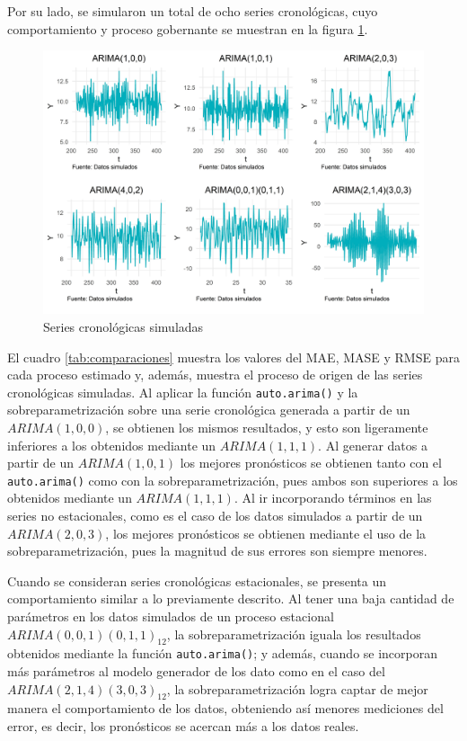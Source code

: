 \documentclass[
]{article}
\begin{document}
Por su lado, se simularon un total de ocho series cronológicas, cuyo
comportamiento y proceso gobernante se muestran en la figura
\ref{fig:series_simuladas}.

\begin{figure}[!h]
\includegraphics[width=1\linewidth,height=1\textheight]{Tesis_files/figure-latex/series_simuladas-1} \caption{Series cronológicas simuladas}\label{fig:series_simuladas}
\end{figure}

El cuadro \ref{tab:comparaciones} muestra los valores del MAE, MASE y
RMSE para cada proceso estimado y, además, muestra el proceso de origen
de las series cronológicas simuladas. Al aplicar la función
\texttt{auto.arima()} y la sobreparametrización sobre una serie
cronológica generada a partir de un \(ARIMA(1,0,0)\), se obtienen los
mismos resultados, y esto son ligeramente inferiores a los obtenidos
mediante un \(ARIMA(1,1,1)\). Al generar datos a partir de un
\(ARIMA(1,0,1)\) los mejores pronósticos se obtienen tanto con el
\texttt{auto.arima()} como con la sobreparametrización, pues ambos son
superiores a los obtenidos mediante un \(ARIMA(1,1,1)\). Al ir
incorporando términos en las series no estacionales, como es el caso de
los datos simulados a partir de un \(ARIMA(2,0,3)\), los mejores
pronósticos se obtienen mediante el uso de la sobreparametrización, pues
la magnitud de sus errores son siempre menores.

Cuando se consideran series cronológicas estacionales, se presenta un
comportamiento similar a lo previamente descrito. Al tener una baja
cantidad de parámetros en los datos simulados de un proceso estacional
\(ARIMA(0,0,1)(0,1,1)_{12}\), la sobreparametrización iguala los
resultados obtenidos mediante la función \texttt{auto.arima()}; y
además, cuando se incorporan más parámetros al modelo generador de los
dato como en el caso del \(ARIMA(2,1,4)(3,0,3)_{12}\), la
sobreparametrización logra captar de mejor manera el comportamiento de
los datos, obteniendo así menores mediciones del error, es decir, los
pronósticos se acercan más a los datos reales.
\end{document}
